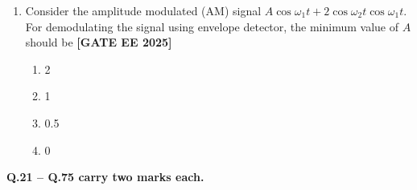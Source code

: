 \documentclass[12pt,a4paper]{article}
\begin{document}
\begin{enumerate}[leftmargin=2.5em, label=\textbf{Q.\arabic*}., itemsep=2em]
\item Consider the amplitude modulated (AM) signal $A\cos\omega_1 t+2\cos\omega_2 t\cos\omega_1 t$. For demodulating the signal using envelope detector, the minimum value of $A$ should be
\newline
\noindent \textbf{[GATE EE 2025]}
\begin{enumerate}[label=(\Alph*)]
  \item 2
  \item 1
  \item 0.5
  \item 0
\end{enumerate}

\end{enumerate}

\vspace{1em}
\item \textbf{Q.21 – Q.75 carry two marks each.}
\vspace{1em}
\end{document}
